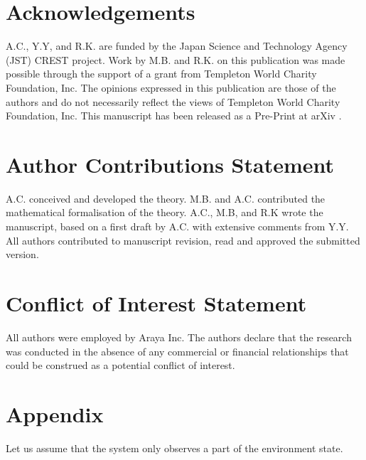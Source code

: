 \documentclass[utf8]{article}
\begin{document}
	\section*{Acknowledgements}
	A.C., Y.Y, and R.K. are funded by the Japan Science and Technology Agency (JST) CREST project. Work by M.B. and R.K. on this publication was made possible through the support of a grant from Templeton World Charity Foundation, Inc. The opinions expressed in this publication are those of the authors and do not necessarily reflect the views of Templeton World Charity Foundation, Inc. This manuscript has been released as a Pre-Print at arXiv \citep{chang2019information}.


    \section*{Author Contributions Statement}
    A.C. conceived and developed the theory. M.B. and A.C. contributed the mathematical formalisation of the theory. A.C., M.B, and R.K wrote the manuscript, based on a first draft by A.C. with extensive comments from Y.Y. All authors contributed to manuscript revision, read and approved the submitted version.

    \section*{Conflict of Interest Statement}
    All authors were employed by Araya Inc. The authors declare that the research was conducted in the absence of any commercial or financial relationships that could be construed as a potential conflict of interest.
\section*{Appendix}
\label{sec:appendix}
            Let us assume that the system only observes a part of the environment state.
            
\end{document}

